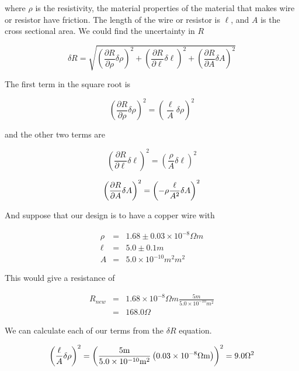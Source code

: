 where $\rho $ is the resistivity, the material properties of the material that makes wire or resistor have friction. The length of the wire or resistor is $\ell $, and $A$ is the cross sectional area. We could find the uncertainty in $R$

\begin{equation*}
	\delta R=\sqrt{\left( \frac{\partial R}{\partial \rho }\delta \rho \right)
		^{2}+\left( \frac{\partial R}{\partial \ell }\delta \ell \right) ^{2}+\left( 
		\frac{\partial R}{\partial A}\delta A\right) ^{2}}
\end{equation*}

The first term in the square root is 

\begin{equation*}
	\left( \frac{\partial R}{\partial \rho }\delta \rho \right) ^{2}=\left( 
	\frac{\ell }{A}\delta \rho \right) ^{2}
\end{equation*}

and the other two terms are 

\begin{equation*}
	\left( \frac{\partial R}{\partial \ell }\delta \ell \right) ^{2}=\left( 
	\frac{\rho }{A}\delta \ell \right) ^{2}
\end{equation*}

\begin{equation*}
	\left( \frac{\partial R}{\partial A}\delta A\right) ^{2}=\left( -\rho \frac{%
		\ell }{A^{2}}\delta A\right) ^{2}
\end{equation*}

And suppose that our design is to have a copper wire with 

\begin{eqnarray*}
	\rho &=&1.68\pm 0.03\times 10^{-8}\unit{\Omega}\unit{m} \\
	\ell &=&5.0\pm 0.1\unit{m} \\
       A &=&5.0\times 10^{-10}\unit{m}^{2}\unit{m}^{2}
\end{eqnarray*}

This would give a resistance of 

\begin{eqnarray*}
	R_{new} &=&1.68\times 10^{-8}\unit{\Omega}\unit{m}\frac{5\unit{m}}{5.0\times 10^{-10}\unit{m}^{2}} \\
	&=&168.0\unit{\Omega}
\end{eqnarray*}

We can calculate each of our terms from the $\delta R$ equation. 

\begin{equation*}
	\left( \frac{\ell }{A}\delta \rho \right) ^{2}=\left( \frac{5\unit{m}}{%
		5.0\times 10^{-10}\unit{m}^{2}}\left( 0.03\times 10^{-8}\unit{\Omega	}\unit{m}\right) \right) ^{2}=9.0\unit{\Omega}^{2}
\end{equation*}

